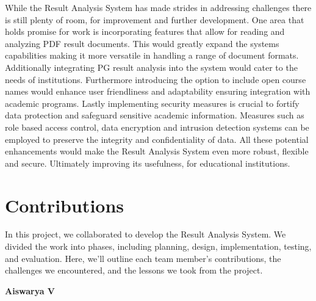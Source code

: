 \documentclass{nascproject}
\begin{document}
While the Result Analysis System has made strides in addressing challenges there is still plenty of room, for improvement and further development. One area that holds promise for work is incorporating features that allow for reading and analyzing PDF result documents. This would greatly expand the systems capabilities making it more versatile in handling a range of document formats. Additionally integrating PG result analysis into the system would cater to the needs of institutions. Furthermore introducing the option to include open course names would enhance user friendliness and adaptability ensuring integration with academic programs. Lastly implementing security measures is crucial to fortify data protection and safeguard sensitive academic information. Measures such as role based access control, data encryption and intrusion detection systems can be employed to preserve the integrity and confidentiality of data. All these potential enhancements would make the Result Analysis System even more robust, flexible and secure. Ultimately improving its usefulness, for educational institutions.



\chapter{Contributions}
	In this project, we collaborated to develop the Result Analysis System. We divided the work into phases, including planning, design, implementation, testing, and evaluation. Here, we'll outline each team member's contributions, the challenges we encountered, and the lessons we took from the project.
	
	
	\textbf{Aiswarya V}
	
\end{document}
